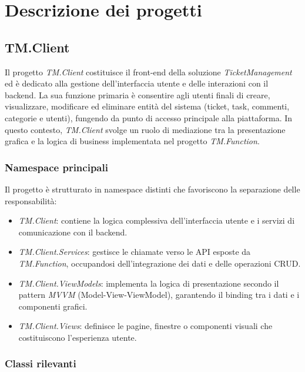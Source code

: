 \section{Descrizione dei progetti}
\subsection{TM.Client}

Il progetto \textit{TM.Client} costituisce il front-end della soluzione \textit{TicketManagement} ed è dedicato alla gestione dell'interfaccia utente e delle interazioni con il backend. La sua funzione primaria è consentire agli utenti finali di creare, visualizzare, modificare ed eliminare entità del sistema (ticket, task, commenti, categorie e utenti), fungendo da punto di accesso principale alla piattaforma. In questo contesto, \textit{TM.Client} svolge un ruolo di mediazione tra la presentazione grafica e la logica di business implementata nel progetto \textit{TM.Function}.
\\
\subsubsection{Namespace principali}

Il progetto è strutturato in namespace distinti che favoriscono la separazione delle responsabilità:
\begin{itemize}
\item \textit{TM.Client}: contiene la logica complessiva dell'interfaccia utente e i servizi di comunicazione con il backend.

\item \textit{TM.Client.Services}: gestisce le chiamate verso le API esposte da \textit{TM.Function}, occupandosi dell'integrazione dei dati e delle operazioni CRUD.

\item \textit{TM.Client.ViewModels}: implementa la logica di presentazione secondo il pattern \textit{MVVM} (Model-View-ViewModel), garantendo il binding tra i dati e i componenti grafici.

\item \textit{TM.Client.Views}: definisce le pagine, finestre o componenti visuali che costituiscono l'esperienza utente.
\end{itemize}

\subsubsection{Classi rilevanti}

